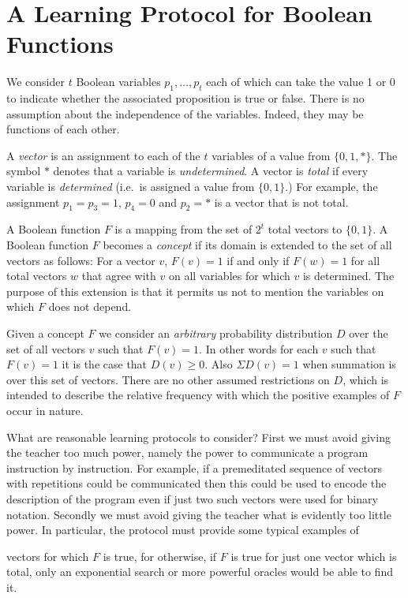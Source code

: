 \section{A Learning Protocol for Boolean Functions}

We consider $t$ Boolean variables $p_1,\ldots,p_t$
each of which can take the value 1 or 0 to indicate
whether the associated proposition is true or
false.  There is no assumption about the independence of the variables.  Indeed, they may be functions of each other.

A \emph{vector} is an assignment to each of the $t$
variables of a value from $\{0,1,*\}$.  The symbol $*$
denotes that a variable is \emph{undetermined}.  A vector
is \emph{total} if every variable is \emph{determined} (i.e.\ is
assigned a value from $\{0,1\}$.)  For example, the
assignment $p_1 = p_3 = 1$, $p_4 = 0$ and $p_2 = {*}$ is a
vector that is not total.

A Boolean function $F$ is a mapping from the
set of $2^t$ total vectors to $\{0,1\}$.  A Boolean
function $F$ becomes a \emph{concept} if its domain
is extended to the set of all vectors as follows:
For a vector $v$, $F(v) = 1$ if and only if $F(w) = 1$
for all total vectors $w$ that agree with $v$ on
all variables for which $v$ is determined.  The
purpose of this extension is that it permits us
not to mention the variables on which $F$ does
not depend.

Given a concept $F$ we consider an \emph{arbitrary}
probability distribution $D$ over the set of all
vectors $v$ such that $F(v) = 1$.  In other words
for each $v$ such that $F(v) = 1$ it is the case
that $D(v) \geqslant 0$.  Also $\Sigma D(v) = 1$ when summation
is over this set of vectors.  There are no other
assumed restrictions on $D$, which is intended to
describe the relative frequency with which the
positive examples of $F$ occur in nature.

What are reasonable learning protocols to
consider?  First we must avoid giving the teacher
too much power, namely the power to communicate a
program instruction by instruction.  For example,
if a premeditated sequence of vectors with repetitions could be communicated then this could be used
to encode the description of the program even if
just two such vectors were used for binary notation.
Secondly we must avoid giving the teacher what is
evidently too little power.  In particular, the
protocol must provide some typical examples of

\noindent
vectors for which $F$ is true, for otherwise, if
$F$ is true for just one vector which is total,
only an exponential search or more powerful oracles
would be able to find it.

